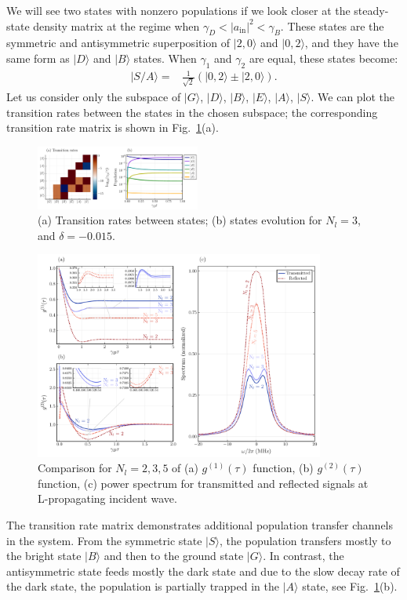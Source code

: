 \documentclass[lettersize,journal]{IEEEtran}
\begin{document}
We will see two states with nonzero populations if we look closer at the steady-state density matrix at the regime when $\gamma_D < |a_\mathrm{in}|^2 < \gamma_B$.
These states are the symmetric and antisymmetric superposition of $|2,0\rangle$ and $|0, 2\rangle$, and they have the same form as $|D\rangle$ and $|B\rangle$ states.
When $\gamma_1$ and $\gamma_2$ are equal, these states become:
\begin{equation} \label{eq:19}
    \begin{aligned}
        |S/A\rangle =& \frac{1}{\sqrt{2}} \left( |0,2\rangle \pm |2,0\rangle \right).
    \end{aligned}
\end{equation}
Let us consider only the subspace of $|G\rangle$, $|D\rangle$, $|B\rangle$, $|E\rangle$, $|A\rangle$, $|S\rangle$. 
We can plot the transition rates between the states in the chosen subspace; the corresponding transition rate matrix is shown in Fig.~\ref{fig:04_1}(a).
\begin{figure}[h!]
    \centering
    \includegraphics[width=0.48\textwidth]{fig_8}
    \caption{(a) Transition rates between states; (b) states evolution for $N_l = 3$, and $\delta = - 0.015$.}
    \label{fig:04_1}
\end{figure}
\begin{figure}[h]
    \centering
    \includegraphics[width=0.85\textwidth]{fig_4_delta-0.15}
    \caption{Comparison for $N_l = 2, 3, 5$ of (a) $g^{(1)}(\tau)$ function, (b) $g^{(2)}(\tau)$ function, (c) power spectrum for transmitted and reflected signals at L-propagating incident wave.}
    \label{fig:06}
\end{figure}
The transition rate matrix demonstrates additional population transfer channels in the system.
From the symmetric state $|S\rangle$, the population transfers mostly to the bright state $|B\rangle$ and then to the ground state $|G\rangle$.
In contrast, the antisymmetric state feeds mostly the dark state and due to the slow decay rate of the dark state, the population is partially trapped in the $|A\rangle$ state, see Fig.~\ref{fig:04_1}(b).
\end{document}
